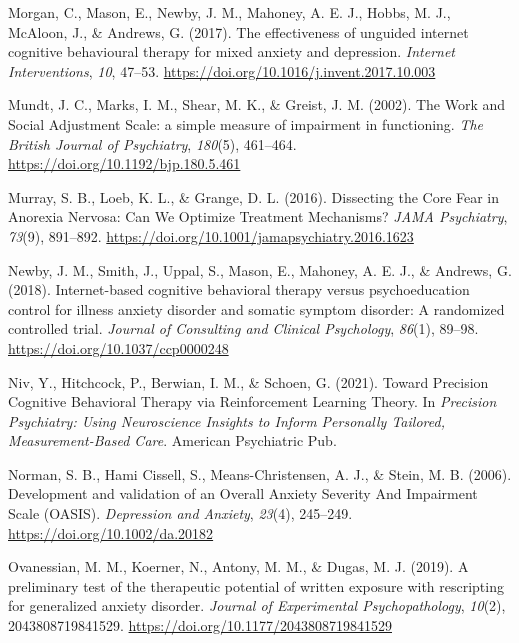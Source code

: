 \documentclass[
  man,floatsintext]{apa7}
\newlength{\cslhangindent}
\newlength{\cslentryspacingunit} %
\newenvironment{CSLReferences}[2] %
 {%
  \setlength{\parindent}{0pt}
  \ifodd #1
  \let\oldpar\par
  \def\par{\hangindent=\cslhangindent\oldpar}
  \fi
  \setlength{\parskip}{#2\cslentryspacingunit}
 }%
 {}
\begin{document}
\begin{CSLReferences}{1}{0}
\leavevmode{}%
Morgan, C., Mason, E., Newby, J. M., Mahoney, A. E. J., Hobbs, M. J., McAloon, J., \& Andrews, G. (2017). The effectiveness of unguided internet cognitive behavioural therapy for mixed anxiety and depression. \emph{Internet Interventions}, \emph{10}, 47--53. \url{https://doi.org/10.1016/j.invent.2017.10.003}

\leavevmode{}%
Mundt, J. C., Marks, I. M., Shear, M. K., \& Greist, J. M. (2002). The Work and Social Adjustment Scale: a simple measure of impairment in functioning. \emph{The British Journal of Psychiatry}, \emph{180}(5), 461--464. \url{https://doi.org/10.1192/bjp.180.5.461}

\leavevmode{}%
Murray, S. B., Loeb, K. L., \& Grange, D. L. (2016). Dissecting the Core Fear in Anorexia Nervosa: Can We Optimize Treatment Mechanisms? \emph{JAMA Psychiatry}, \emph{73}(9), 891--892. \url{https://doi.org/10.1001/jamapsychiatry.2016.1623}

\leavevmode{}%
Newby, J. M., Smith, J., Uppal, S., Mason, E., Mahoney, A. E. J., \& Andrews, G. (2018). Internet-based cognitive behavioral therapy versus psychoeducation control for illness anxiety disorder and somatic symptom disorder: A randomized controlled trial. \emph{Journal of Consulting and Clinical Psychology}, \emph{86}(1), 89--98. \url{https://doi.org/10.1037/ccp0000248}

\leavevmode{}%
Niv, Y., Hitchcock, P., Berwian, I. M., \& Schoen, G. (2021). Toward Precision Cognitive Behavioral Therapy via Reinforcement Learning Theory. In \emph{Precision Psychiatry: Using Neuroscience Insights to Inform Personally Tailored, Measurement-Based Care}. American Psychiatric Pub.

\leavevmode{}%
Norman, S. B., Hami Cissell, S., Means-Christensen, A. J., \& Stein, M. B. (2006). Development and validation of an Overall Anxiety Severity And Impairment Scale (OASIS). \emph{Depression and Anxiety}, \emph{23}(4), 245--249. \url{https://doi.org/10.1002/da.20182}

\leavevmode{}%
Ovanessian, M. M., Koerner, N., Antony, M. M., \& Dugas, M. J. (2019). A preliminary test of the therapeutic potential of written exposure with rescripting for generalized anxiety disorder. \emph{Journal of Experimental Psychopathology}, \emph{10}(2), 2043808719841529. \url{https://doi.org/10.1177/2043808719841529}


\end{CSLReferences}
\end{document}
